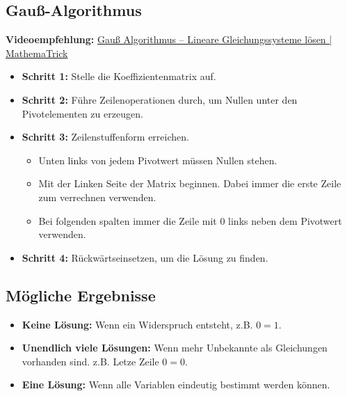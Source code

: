 \documentclass[12pt,a4paper]{article}
\begin{document}
\subsection{Gauß-Algorithmus}
\textbf{Videoempfehlung:} \href{https://youtu.be/aosbq7Ci7Ec}{Gauß Algorithmus – Lineare Gleichungssysteme lösen | MathemaTrick}
\begin{itemize}
    \item \textbf{Schritt 1:} Stelle die Koeffizientenmatrix auf.
    \item \textbf{Schritt 2:} Führe Zeilenoperationen durch, um Nullen unter den Pivotelementen zu erzeugen.
    \item \textbf{Schritt 3:} Zeilenstuffenform erreichen.
    \begin{itemize}
        \item Unten links von jedem Pivotwert müssen Nullen stehen.
        \item Mit der Linken Seite der Matrix beginnen. Dabei immer die erste Zeile zum verrechnen verwenden.
        \item Bei folgenden spalten immer die Zeile mit 0 links neben dem Pivotwert verwenden.
    \end{itemize}
    \item \textbf{Schritt 4:} Rückwärtseinsetzen, um die Lösung zu finden.
\end{itemize}
\subsection{Mögliche Ergebnisse}
\begin{itemize}
    \item \textbf{Keine Lösung:} Wenn ein Widerspruch entsteht, z.B. $0 = 1$.
    \item \textbf{Unendlich viele Lösungen:} Wenn mehr Unbekannte als Gleichungen vorhanden sind. z.B. Letze Zeile $0 = 0$.
    \item \textbf{Eine Lösung:} Wenn alle Variablen eindeutig bestimmt werden können.
\end{itemize}
\end{document}
